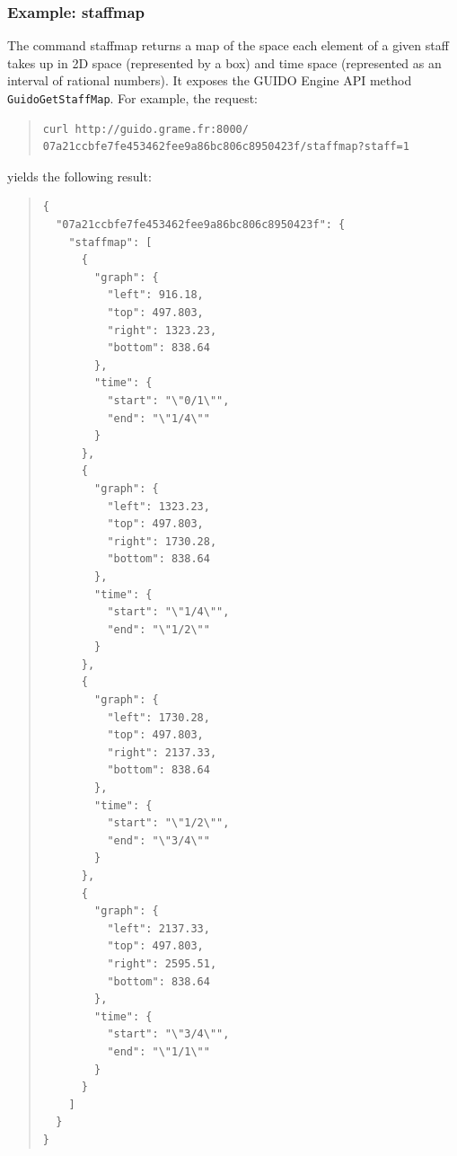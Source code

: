\documentclass{article}
\newcommand{\guidosize}{6pt}
\begin{document}
\subsubsection{Example: staffmap}\label{subsection:staffmap}
The command staffmap returns a map of the space each element of a given staff takes up in 2D space (represented by a box) and time space (represented as an interval of rational numbers).  It exposes the GUIDO Engine API method \verb=GuidoGetStaffMap=.  For example, the request:
\begin{quote}
\begingroup
\fontsize{\guidosize}{12pt}\selectfont
\begin{verbatim}
curl http://guido.grame.fr:8000/
07a21ccbfe7fe453462fee9a86bc806c8950423f/staffmap?staff=1
\end{verbatim}
\endgroup
\end{quote}
yields the following result:
\begin{quote}
\begingroup
\fontsize{\guidosize}{12pt}\selectfont
\begin{verbatim}
{
  "07a21ccbfe7fe453462fee9a86bc806c8950423f": {
    "staffmap": [
      {
        "graph": {
          "left": 916.18,
          "top": 497.803,
          "right": 1323.23,
          "bottom": 838.64
        },
        "time": {
          "start": "\"0/1\"",
          "end": "\"1/4\""
        }
      },
      {
        "graph": {
          "left": 1323.23,
          "top": 497.803,
          "right": 1730.28,
          "bottom": 838.64
        },
        "time": {
          "start": "\"1/4\"",
          "end": "\"1/2\""
        }
      },
      {
        "graph": {
          "left": 1730.28,
          "top": 497.803,
          "right": 2137.33,
          "bottom": 838.64
        },
        "time": {
          "start": "\"1/2\"",
          "end": "\"3/4\""
        }
      },
      {
        "graph": {
          "left": 2137.33,
          "top": 497.803,
          "right": 2595.51,
          "bottom": 838.64
        },
        "time": {
          "start": "\"3/4\"",
          "end": "\"1/1\""
        }
      }
    ]
  }
}
\end{verbatim}
\endgroup
\end{quote}
\end{document}
